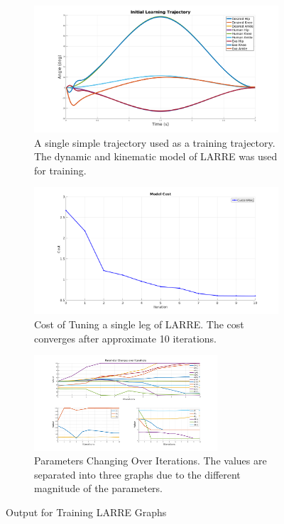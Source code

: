 \begin{figure}
    \centering
    \begin{subfigure}[b]{\textwidth}
        \centering
        \includegraphics[width=0.75\columnwidth]{images/controllers/trajs/init_traj.png}
        \caption[LARRE Training Trajectory]{A single simple trajectory used as a training trajectory. The dynamic and kinematic model of LARRE was used for training. }
        \label{fig:LARRE_Train_Trajectory}
    \end{subfigure}
    
    \begin{subfigure}[b]{\textwidth}
        \centering
        \includegraphics[width=0.75\columnwidth]{images/controllers/trajs/cost.png}
        \caption[LARRE Cost Optimization]{Cost of Tuning a single leg of LARRE. The cost converges after approximate 10 iterations. }
        \label{fig:LARRE_TUNING}
    \end{subfigure}
  
    \begin{subfigure}[b]{\textwidth}
        \centering
        \includegraphics[width=0.75\textwidth]{images/controllers/trajs/params_splite.png}
        \caption[LARRE Parameters Optimization]{Parameters Changing Over Iterations. The values are separated into three graphs due to the different magnitude of the parameters.}
        \label{fig:LARRE_PARAMS}
    \end{subfigure}

    \caption{Output for Training LARRE Graphs}
    \label{fig:traj_training_graph}
\end{figure}


